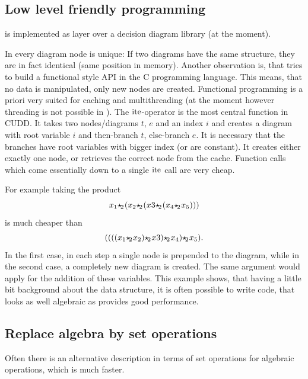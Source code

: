 \subsection{Low level friendly programming}
\label{low-level-friendly}
\PolyBoRi is implemented as layer over a decision diagram library (\CUDD at the moment).

In \CUDD every diagram node is unique: If two diagrams have the same structure, they are in fact identical (same position in memory).
Another observation is, that \CUDD tries to build a functional style API in the C programming language. This means, that no data is manipulated, only new nodes are created.
Functional programming is a priori very suited for caching and multithreading (at the moment however threading is not possible in \PolyBoRi).
The $\operatorname{ite}$-operator is the most central function in CUDD. It takes two nodes/diagrams $t$, $e$ and an index $i$ and creates a diagram with root variable $i$ and
then-branch $t$, else-branch $e$. It is necessary that the branches have root variables with bigger index (or are constant).
It creates either exactly one node, or retrieves the correct node from the cache.
Function calls which come essentially down to a single $\operatorname{ite}$ call are very cheap.

For example taking the product \[
    x_1 {\star\hspace{-.15em}_2\hspace{.05em}} (x_2{\star\hspace{-.15em}_2\hspace{.05em}}(x3{\star\hspace{-.15em}_2\hspace{.05em}} (x_4{\star\hspace{-.15em}_2\hspace{.05em}} x_5)))
\] is much cheaper than \[
    ((((x_1 {\star\hspace{-.15em}_2\hspace{.05em}} x_2){\star\hspace{-.15em}_2\hspace{.05em}} x3){\star\hspace{-.15em}_2\hspace{.05em}} x_4){\star\hspace{-.15em}_2\hspace{.05em}} x_5).
\]
In the first case, in each step a single node is prepended to the diagram, while in the second case, a completely new diagram is created.
The same argument would apply for the addition of these variables.
This example shows, that having a little bit background about the data structure, it is often possible to write code, that looks as well algebraic as provides good performance.

\subsection{Replace algebra by set operations}
Often there is an alternative description in terms of set operations for algebraic operations, which is much faster.


